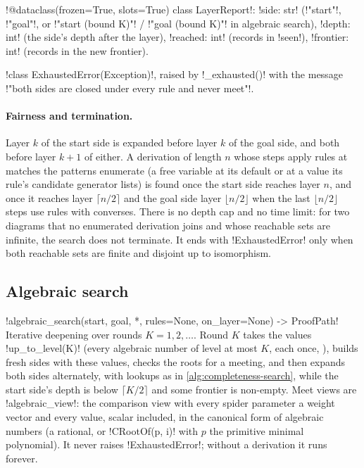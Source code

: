 \begin{signature}
\py!@dataclass(frozen=True, slots=True) class LayerReport!: \py!side: str! (\code!"start"!,
\code!"goal"!, or \code!"start (bound K)"! / \code!"goal (bound K)"! in algebraic search),
\py!depth: int! (the side's depth after the layer), \py!reached: int! (records in \py!seen!),
\py!frontier: int! (records in the new frontier).

\py!class ExhaustedError(Exception)!, raised by \py!_exhausted()! with the message
\code!"both sides are closed under every rule and never meet"!.
\end{signature}

\paragraph{Fairness and termination.} Layer $k$ of the start side is expanded before layer $k$ of
the goal side, and both before layer $k+1$ of either. A derivation of length $n$ whose steps apply
rules at matches the patterns enumerate (a free variable at its default or at a value its rule's
candidate generator lists) is found once the start side reaches layer $n$, and once it reaches
layer $\lceil n/2\rceil$ and the goal side layer $\lfloor n/2\rfloor$ when the last
$\lfloor n/2\rfloor$ steps use rules with converses. There is no depth cap and no time limit: for
two diagrams that no enumerated derivation joins and whose reachable sets are infinite, the search
does not terminate. It ends with \py!ExhaustedError! only when both reachable sets are finite and
disjoint up to isomorphism.

\subsection{Algebraic search}

\begin{signature}
\py!algebraic_search(start, goal, *, rules=None, on_layer=None) -> ProofPath!\\
Iterative deepening over rounds $K=1,2,\dots$. Round $K$ takes the values \py!up_to_level(K)!
(every algebraic number of level at most $K$, each once, ),
builds fresh sides with these values, checks the roots for a meeting, and then expands both sides
alternately, with lookups as in \cref{alg:completeness-search}, while the start side's depth is
below $\lceil K/2\rceil$ and some frontier is non-empty. Meet views are \py!algebraic_view!: the
comparison view with every spider parameter a weight vector and every value, scalar included, in
the canonical form of algebraic numbers (a rational, or \py!CRootOf(p, i)! with $p$ the primitive
minimal polynomial). It never raises \py!ExhaustedError!; without a derivation it runs forever.
\end{signature}

